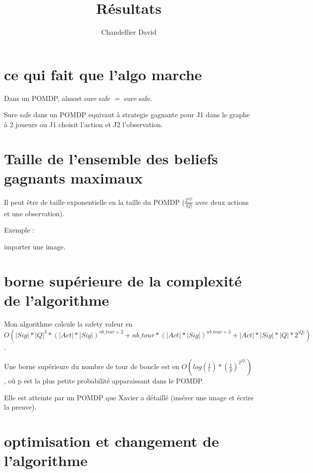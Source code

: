 \documentclass{article}
\title{Résultats}
\author{Chandellier David}
\begin{document}
\maketitle

\section{ce qui fait que l'algo marche}

    Dans un POMDP, almost sure safe $=$ sure safe. \newline

    Sure safe dans un POMDP equivaut à strategie gagnante pour J1 dans le graphe à 2 joueurs ou J1 choisit l'action et J2 l'observation. \newline 

\section{Taille de l'ensemble des beliefs gagnants maximaux}

    Il peut être de taille exponentielle en la taille du POMDP ($\frac{2^{|Q|}}{|Q|}$ avec deux actions et une observation). \newline

    Exemple : \newline

    importer une image.

\section{borne supérieure de la complexité de l'algorithme}

    Mon algorithme calcule la safety valeur en 
    $O(|Sig|*|Q|^{3}*(|Act|*|Sig|)^{nb\_tour+2} + nb\_tour*(|Act|*|Sig|)^{nb\_tour + 3} + |Act|*|Sig|*|Q|*2^{|Q|})$. \newline

    Une borne supérieure du nombre de tour de boucle est en $O(log(\frac{1}{\epsilon})*(\frac{1}{p})^{2^{|Q|}})$,
    où p est la plus petite probabilité apparaissant dans le POMDP. \newline

    Elle est atteinte par un POMDP que Xavier a détaillé (insérer une image et écrire la preuve).

\section{optimisation et changement de l'algorithme}
\end{document}
